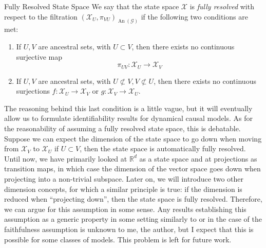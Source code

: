 \documentclass[11pt, a4paper]{memoir}
\theoremstyle{break}
\theoremstyle{break}
\theoremstyle{nonumberplain}
\newcommand{\mR}{\mathbb{R}}
\DeclareMathOperator{\an}{An}
\begin{document}
\begin{mydefinition}{Fully Resolved State Space}
We say that the state space $\mathcal{X}$ is \emph{fully resolved} with respect to the filtration $(\mathcal{X}_U,\pi_{VU})_{\an(\mathcal{G})}$ if the following two conditions are met:
\begin{enumerate}[label=(\roman*)]
	\item If $U,V$ are ancestral sets, with $U\subset V$, then there exists no continuous surjective map
	$$\pi_{UV}:\mathcal{X}_{U}\to \mathcal{X}_V$$
	\item If $U,V$ are ancestral sets, with $U\not\subset V, V\not\subset U$, then there exists no continuous surjections
	$f:\mathcal{X}_U\to \mathcal{X}_V$ or $g:\mathcal{X}_V\to \mathcal{X}_U$.
\end{enumerate}
\end{mydefinition}
The reasoning behind this last condition is a little vague, but it will eventually allow us to formulate identifiability results for dynamical causal models. As for the reasonability of assuming a fully resolved state space, this is debatable. Suppose we can expect the dimension of the state space to go down when moving from $\mathcal{X}_V$ to $\mathcal{X}_U$ if $U\subset V$, then the state space is automatically fully resolved. Until now, we have primarily looked at $\mR^d$ as a state space and at projections as transition maps, in which case the dimension of the vector space goes down when projecting into a non-trivial subspace. Later on, we will introduce two other dimension concepts, for which a similar principle is true: if the dimension is reduced when \enquote{projecting down}, then the state space is fully resolved. Therefore, we can argue for this assumption in some sense. Any results establishing this assumption as a generic property in some setting similarly to \cite{Faithful1} or \cite{Spirtes} in the case of the faithfulness assumption is unknown to me, the author, but I expect that this is possible for some classes of models. This problem is left for future work.\\\\
\end{document}
